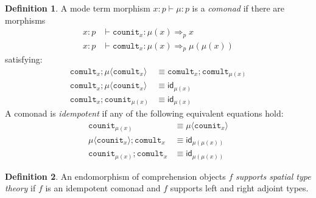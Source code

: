 \documentclass[10pt]{article}
\theoremstyle{definition}
\newtheorem{definition}{Definition}
\newcommand{\yields}{\vdash}
\newcommand{\id}{\mathsf{id}}
\newcommand\ap[2]{\ensuremath{#1 \langle #2 \rangle }}
\newcommand\fcomult[1]{\ensuremath{\mathtt{comult}_{#1}}}
\newcommand\fcounit[1]{\ensuremath{\mathtt{counit}_{#1}}}
\begin{document}
\begin{definition}
A mode term morphism $x : p \yields \mu : p$ is a \emph{comonad} if there are morphisms
\begin{align*}
x : p &\yields \fcounit{x} : \mu(x) \Rightarrow_p x \\
x : p &\yields \fcomult{x} : \mu(x) \Rightarrow_p \mu(\mu(x))
\end{align*}
satisfying:
\begin{align}
\fcomult{x};\ap{\mu}{\fcomult{x}} &\equiv \fcomult{x};\fcomult{\mu(x)} \\
\fcomult{x};\ap{\mu}{\fcounit{x}} &\equiv \id_{\mu(x)} \\
\fcomult{x};\fcounit{\mu(x)} &\equiv \id_{\mu(x)}
\end{align}
A comonad is \emph{idempotent} if any of the following equivalent equations hold:
\begin{align}
\fcounit{\mu(x)} &\equiv \ap{\mu}{\fcounit{x}} \\
\ap{\mu}{\fcounit{x}} ; \fcomult{x} &\equiv \id_{\mu(\mu(x))} \\
\fcounit{\mu(x)} ; \fcomult{x} &\equiv \id_{\mu(\mu(x))} 
\end{align}
\end{definition}

\begin{definition}\label{def:supports-spatial}
An endomorphism of comprehension objects $f$ \emph{supports spatial type
  theory} if $f$ is an idempotent comonad and $f$ supports
left and right adjoint types.
\end{definition}
\end{document}
